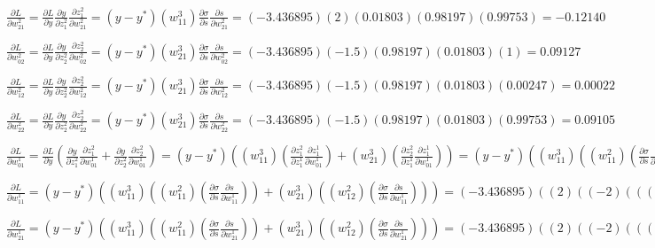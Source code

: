 \documentclass[12pt, fullpage,letterpaper]{article}
\begin{document}
\begin{enumerate}
	$\frac{\partial L}{\partial w^{2}_{21}} = \frac{\partial L}{\partial y}\frac{\partial y}{\partial z^2_1}\frac{\partial z^2_1}{\partial w^{2}_{21}} = (y-y^*)(w^{3}_{11})\frac{\partial \sigma}{\partial s}\frac{\partial s}{\partial w^{2}_{21}} = (-3.436895)(2)(0.01803)(0.98197)(0.99753) = -0.12140$
	
	$\frac{\partial L}{\partial w^{2}_{02}} = \frac{\partial L}{\partial y}\frac{\partial y}{\partial z^2_2}\frac{\partial z^2_2}{\partial w^{2}_{02}} = (y-y^*)(w^{3}_{21})\frac{\partial \sigma}{\partial s}\frac{\partial s}{\partial w^{2}_{02}} = (-3.436895)(-1.5)(0.98197)(0.01803)(1) = 0.09127$

	$\frac{\partial L}{\partial w^{2}_{12}} = \frac{\partial L}{\partial y}\frac{\partial y}{\partial z^2_2}\frac{\partial z^2_2}{\partial w^{2}_{12}} = (y-y^*)(w^{3}_{21})\frac{\partial \sigma}{\partial s}\frac{\partial s}{\partial w^{2}_{12}} = (-3.436895)(-1.5)(0.98197)(0.01803)(0.00247) = 0.00022$
	
	$\frac{\partial L}{\partial w^{2}_{22}} = \frac{\partial L}{\partial y}\frac{\partial y}{\partial z^2_2}\frac{\partial z^2_2}{\partial w^{2}_{22}} = (y-y^*)(w^{3}_{21})\frac{\partial \sigma}{\partial s}\frac{\partial s}{\partial w^{2}_{22}} = (-3.436895)(-1.5)(0.98197)(0.01803)(0.99753) = 0.09105$

	$\frac{\partial L}{\partial w^{1}_{01}} = \frac{\partial L}{\partial y}(\frac{\partial y}{\partial z^2_1}\frac{\partial z^2_1}{\partial w^{1}_{01}} + \frac{\partial y}{\partial z^2_2}\frac{\partial z^2_2}{\partial w^{1}_{01}}) = (y-y^*)((w^3_{11})(\frac{\partial z^2_1}{\partial z^1_1}\frac{\partial z^1_1}{\partial w^{1}_{01}}) + (w^3_{21})(\frac{\partial z^2_2}{\partial z^1_1}\frac{\partial z^1_1}{\partial w^{1}_{01}})) = (y-y^*)((w^3_{11})((w^2_{11})(\frac{\partial \sigma}{\partial s}\frac{\partial s}{\partial w^{1}_{01}})) + (w^3_{21})((w^2_{12})(\frac{\partial \sigma}{\partial s}\frac{\partial s}{\partial w^{1}_{01}}))) = (-3.436895)((2)((-2)(((0.00247)(0.99753))(1))+(-1.5)((2)(((0.00247)(0.99753))(1))))) = 0.08468$
	
	$\frac{\partial L}{\partial w^{1}_{11}} = (y-y^*)((w^3_{11})((w^2_{11})(\frac{\partial \sigma}{\partial s}\frac{\partial s}{\partial w^{1}_{11}})) + (w^3_{21})((w^2_{12})(\frac{\partial \sigma}{\partial s}\frac{\partial s}{\partial w^{1}_{11}}))) = (-3.436895)((2)((-2)(((0.00247)(0.99753))(1))+(-1.5)((2)(((0.00247)(0.99753))(1))))) = 0.08468$
	
	$\frac{\partial L}{\partial w^{1}_{21}} = (y-y^*)((w^3_{11})((w^2_{11})(\frac{\partial \sigma}{\partial s}\frac{\partial s}{\partial w^{1}_{21}})) + (w^3_{21})((w^2_{12})(\frac{\partial \sigma}{\partial s}\frac{\partial s}{\partial w^{1}_{21}}))) = (-3.436895)((2)((-2)(((0.00247)(0.99753))(1))+(-1.5)((2)(((0.00247)(0.99753))(1))))) = 0.08468$
	

\end{enumerate}
\end{document}
